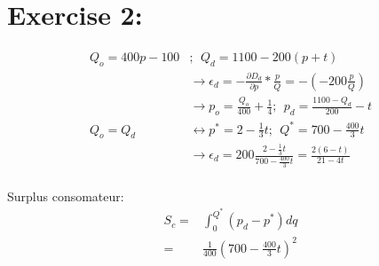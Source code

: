 \documentclass[12pt]{report}
\numberwithin{equation}{section}
\begin{document}
\section{Exercise 2:}

\begin{align*}
Q_o = 400p-100&; ~~Q_d = 1100-200(p+t) \\
&\rightarrow \epsilon_d = -\frac{\partial D_d}{\partial p}*\frac{p}{Q}=-(-200 \frac{p}{Q}) \\
&\rightarrow 
p_o = \frac{Q_o}{400} + \frac{1}{4} ; ~~p_d = \frac{1100-Q_d}{200}-t  \\
Q_o = Q_d 
&\leftrightarrow p^* = 2 - \frac{1}{3}t; ~~ Q^*=700 - \frac{400}{3}t \\ 
&\rightarrow \epsilon_d = 200 \frac{2 - \frac{1}{3}t}{700 - \frac{400}{3}t} = \frac{2(6-t)}{21-4t} \\
\end{align*}

Surplus consomateur:
\begin{align*}
S_c = &\int^{Q^*}_{0} (p_d - p^*)dq \\
= &\frac{1}{400} \left(700 - \frac{400}{3}t \right)^2   \\
\end{align*}
\end{document}
